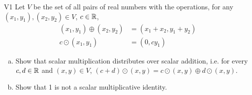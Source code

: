 \begin{problem}{V1}
Let \(V\) be the set of all pairs of real numbers with the operations, for any \((x_1,y_1), (x_2,y_2) \in V\), \(c\in \mathbb{R}\),
\begin{align*}
(x_1,y_1) \oplus (x_2,y_2) &= (x_1+x_2,y_1+y_2) \\
c \odot (x_1,y_1) &= (0, cy_1)
\end{align*}
\begin{enumerate}[(a)]
\item Show that scalar multiplication
      distributes over scalar addition, i.e. for every \(c,d \in \mathbb{R}\) and \( (x,y) \in V\),
      \((c+d)\odot(x,y)=
      c\odot(x,y) \oplus d\odot(x,y)\).
\item Show that 1 is not a scalar multiplicative identity.
\end{enumerate}
\end{problem}
\begin{solution}
\end{solution}


